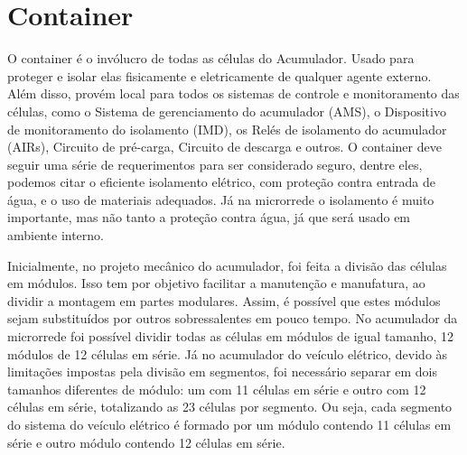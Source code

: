 
\section{Container}

    O container é o invólucro de todas as células do Acumulador. Usado para proteger e isolar elas fisicamente e eletricamente de qualquer agente externo. Além disso, provém local para todos os sistemas de controle e monitoramento das células, como o Sistema de gerenciamento do acumulador (AMS), o Dispositivo de monitoramento do isolamento (IMD), os Relés de isolamento do acumulador (AIRs), Circuito de pré-carga, Circuito de descarga e outros. O container deve seguir uma série de requerimentos para ser considerado seguro, dentre eles, podemos citar o eficiente isolamento elétrico, com proteção contra entrada de água, e o uso de materiais adequados. Já na microrrede o isolamento é muito importante, mas não tanto a proteção contra água, já que será usado em ambiente interno.

    Inicialmente, no projeto mecânico do acumulador, foi feita a divisão das células em módulos. Isso tem por objetivo facilitar a manutenção e manufatura, ao dividir a montagem em partes modulares. Assim, é possível que estes módulos sejam substituídos por outros sobressalentes em pouco tempo. No acumulador da microrrede foi possível dividir todas as células em módulos de igual tamanho, 12 módulos de 12 células em série. Já no acumulador do veículo elétrico, devido às limitações impostas pela divisão em segmentos, foi necessário separar em dois tamanhos diferentes de módulo: um com 11 células em série e outro com 12 células em série, totalizando as 23 células por segmento. Ou seja, cada segmento do sistema do veículo elétrico é formado por um módulo contendo 11 células em série e outro módulo contendo 12 células em série.

